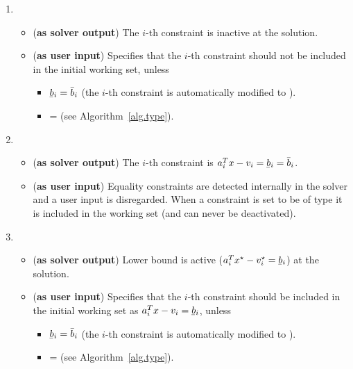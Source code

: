 \documentclass[12pt,a4paper]{article}
\newcommand{\ubar}[1]{\underaccent{\bar}{#1}}
\begin{document}
\begin{enumerate}
\item {}

  \begin{itemize}
  \item ({\bf as solver output}) The $i$-th constraint is inactive at the solution. 
  \item ({\bf as user input}) Specifies that the $i$-th constraint should not be included in
    the initial working set, unless
    \begin{itemize}
    \item[\ding{237}] $\ubar{b}_i = \bar{b}_i$ (the $i$-th constraint is automatically modified to
      ).
    \item[\ding{237}]  =  (see Algorithm~\ref{alg.type}).
    \end{itemize}
  \end{itemize}

\item {}

  \begin{itemize}
  \item ({\bf as solver output}) The $i$-th constraint is $a_i^Tx - v_i = \ubar{b}_i = \bar{b}_i$.
  \item ({\bf as user input}) Equality constraints are detected internally in the solver and
    a user input  is disregarded. When a constraint is set to be of type
     it is included in the working set (and can never be deactivated).
  \end{itemize}

\item {}

  \begin{itemize}
  \item ({\bf as solver output}) Lower bound is active ($a_i^Tx^{\star} - v_i^{\star} = \ubar{b}_i$) at the solution.
  \item ({\bf as user input}) Specifies that the $i$-th constraint should be included in the
    initial working set as $a_i^Tx - v_i = \ubar{b}_i$, unless
    \begin{itemize}
    \item[\ding{237}] $\ubar{b}_i = \bar{b}_i$ (the $i$-th constraint is automatically modified to
      ).
    \item[\ding{237}]  =  (see Algorithm~\ref{alg.type}).
    \end{itemize}
  \end{itemize}


\end{enumerate}
\end{document}
